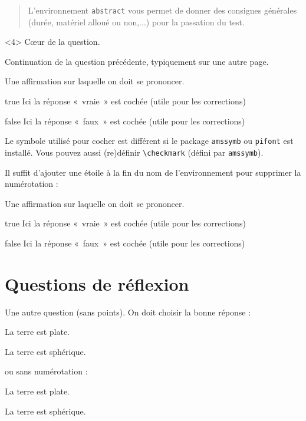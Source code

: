\documentclass[12pt,a4paper, rulers%
]{tests}
\begin{document}
\begin{abstract}
  L'environnement \verb+abstract+ vous permet de donner des
  consignes générales (durée, matériel alloué ou non,...) pour la
  passation du test.
\end{abstract}


\begin{question}<4>
  Cœur de la question.
\end{question}

\begin{question*}
  Continuation de la question précédente, typiquement sur une autre
  page.
\end{question*}


\begin{question}
  \begin{TrueFalse}
  \item Une affirmation sur laquelle on doit se prononcer.
  \item[true] Ici la réponse «~vraie~» est cochée (utile pour les
    corrections)
  \item[false] Ici la réponse «~faux~» est cochée (utile pour les
    corrections)
  \end{TrueFalse}
  Le symbole utilisé pour cocher est différent si le package
  \verb+amssymb+ ou \verb+pifont+ est installé.  Vous pouvez aussi
  (re)définir \verb+\checkmark+ (défini par \verb+amssymb+).

  Il suffit d'ajouter une étoile à la fin du nom de l'environnement
  pour supprimer la numérotation :
  \begin{TrueFalse*}
  \item Une affirmation sur laquelle on doit se prononcer.
  \item[true] Ici la réponse «~vraie~» est cochée (utile pour les
    corrections)
  \item[false] Ici la réponse «~faux~» est cochée (utile pour les
    corrections)
  \end{TrueFalse*}
\end{question}

\newpage

\part{Questions de réflexion}

\begin{question}
  Une autre question (sans points).  On doit choisir la bonne réponse :
  \begin{choices}
  \item La terre est plate.
  \item La terre est sphérique.
  \end{choices}
  ou sans numérotation :
  \begin{choices*}
  \item La terre est plate.
  \item La terre est sphérique.
  \end{choices*}
\end{question}
\end{document}
